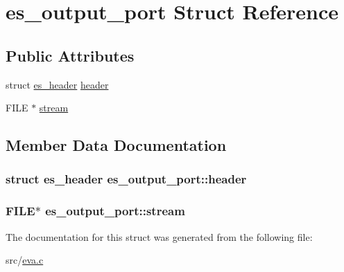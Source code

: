 \hypertarget{structes__output__port}{\section{es\-\_\-output\-\_\-port Struct Reference}
\label{structes__output__port}
}
\subsection*{Public Attributes}
\begin{DoxyCompactItemize}
\item 
struct \hyperlink{structes__header}{es\-\_\-header} \hyperlink{structes__output__port_a5a4781306a8f0c70f0dcbddfc30a1aad}{header}
\item 
F\-I\-L\-E $\ast$ \hyperlink{structes__output__port_a3fd4ead1664a9354f3062adad4a0cd7e}{stream}
\end{DoxyCompactItemize}


\subsection{Member Data Documentation}
\hypertarget{structes__output__port_a5a4781306a8f0c70f0dcbddfc30a1aad}{
\subsubsection[{header}]{\setlength{\rightskip}{0pt plus 5cm}struct {\bf es\-\_\-header} es\-\_\-output\-\_\-port\-::header}}\label{structes__output__port_a5a4781306a8f0c70f0dcbddfc30a1aad}
\hypertarget{structes__output__port_a3fd4ead1664a9354f3062adad4a0cd7e}{
\subsubsection[{stream}]{\setlength{\rightskip}{0pt plus 5cm}F\-I\-L\-E$\ast$ es\-\_\-output\-\_\-port\-::stream}}\label{structes__output__port_a3fd4ead1664a9354f3062adad4a0cd7e}


The documentation for this struct was generated from the following file\-:\begin{DoxyCompactItemize}
\item 
src/\hyperlink{eva_8c}{eva.\-c}\end{DoxyCompactItemize}
